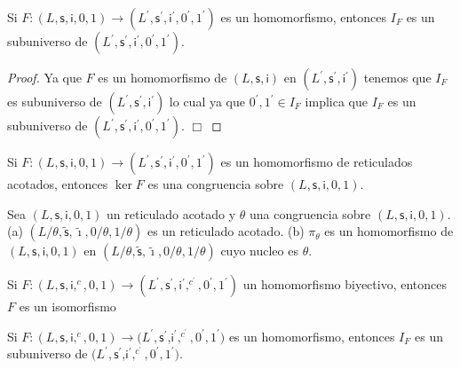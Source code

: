   \begin{lemma}
    Si \(F:(L,\mathsf{s},\mathsf{i},0,1)\rightarrow (L^{\prime },\mathsf{s} ^{\prime },\mathsf{i}^{\prime },0^{\prime },1^{\prime })\) es un homomorfismo, entonces \(I_{F}\) es un subuniverso de \((L^{\prime },\mathsf{s} ^{\prime },\mathsf{i}^{\prime },0^{\prime },1^{\prime })\).
  \end{lemma}
  \begin{proof}
    Ya que \(F\) es un homomorfismo de \((L,\mathsf{s},\mathsf{i})\) en \( (L^{\prime },\mathsf{s}^{\prime },\mathsf{i}^{\prime })\) tenemos que \(I_{F}\) es subuniverso de \((L^{\prime },\mathsf{s}^{\prime },\mathsf{i}^{\prime })\) lo cual ya que \(0^{\prime },1^{\prime }\in I_{F}\) implica que \(I_{F}\) es un subuniverso de \((L^{\prime },\mathsf{s}^{\prime },\mathsf{i}^{\prime },0^{\prime },1^{\prime })\). \(\Box\)
  \end{proof}

  \begin{lemma}
    Si \(F:(L,\mathsf{s},\mathsf{i},0,1)\rightarrow (L^{\prime },\mathsf{s} ^{\prime },\mathsf{i}^{\prime },0^{\prime },1^{\prime })\) es un homomorfismo de reticulados acotados, entonces \(\ker F\) es una congruencia sobre \((L, \mathsf{s},\mathsf{i},0,1)\).
  \end{lemma}

  \begin{lemma}
    Sea \((L,\mathsf{s},\mathsf{i},0,1)\) un reticulado acotado y \(\theta \) una congruencia sobre \((L,\mathsf{s},\mathsf{i},0,1)\).
    (a) \((L/\theta ,\mathsf{\tilde{s}},\mathsf{\tilde{\imath}},0/\theta ,1/\theta )\) es un reticulado acotado.
    (b) \(\pi _{\theta }\) es un homomorfismo de \((L,\mathsf{s},\mathsf{i} ,0,1)\) en \((L/\theta ,\mathsf{\tilde{s}},\mathsf{\tilde{\imath}},0/\theta ,1/\theta )\) cuyo nucleo es \(\theta \).
  \end{lemma}

  \begin{lemma}
    Si \(F:(L,\mathsf{s},\mathsf{i},^{c},0,1)\rightarrow (L^{\prime },\mathsf{s} ^{\prime },\mathsf{i}^{\prime },^{c^{\prime }},0^{\prime },1^{\prime })\) un homomorfismo biyectivo, entonces \(F\) es un isomorfismo
  \end{lemma}

  \begin{lemma}
    Si \(F:(L,\mathsf{s},\mathsf{i},^{c},0,1)\rightarrow (L^{\prime },\mathsf{s} ^{\prime }\),\(\mathsf{i}^{\prime },^{c^{\prime }},0^{\prime },1^{\prime })\) es un homomorfismo, entonces \(I_{F}\) es un subuniverso de \((L^{\prime }, \mathsf{s}^{\prime }\),\(\mathsf{i}^{\prime },^{c^{\prime }},0^{\prime },1^{\prime })\).
  \end{lemma}

